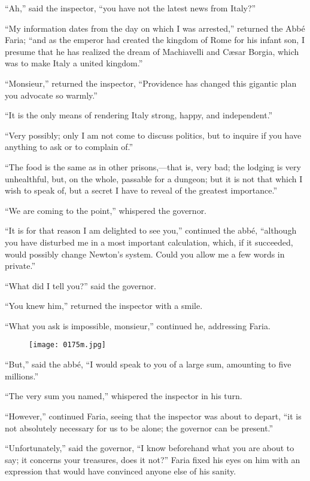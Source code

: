 “Ah,” said the inspector, “you have not the latest news from Italy?”

“My information dates from the day on which I was arrested,” returned
the Abbé Faria; “and as the emperor had created the kingdom of Rome for
his infant son, I presume that he has realized the dream of Machiavelli
and Cæsar Borgia, which was to make Italy a united kingdom.”

“Monsieur,” returned the inspector, “Providence has changed this
gigantic plan you advocate so warmly.”

“It is the only means of rendering Italy strong, happy, and
independent.”

“Very possibly; only I am not come to discuss politics, but to inquire
if you have anything to ask or to complain of.”

“The food is the same as in other prisons,—that is, very bad; the
lodging is very unhealthful, but, on the whole, passable for a dungeon;
but it is not that which I wish to speak of, but a secret I have to
reveal of the greatest importance.”

“We are coming to the point,” whispered the governor.

“It is for that reason I am delighted to see you,” continued the abbé,
“although you have disturbed me in a most important calculation, which,
if it succeeded, would possibly change Newton’s system. Could you allow
me a few words in private.”

“What did I tell you?” said the governor.

“You knew him,” returned the inspector with a smile.

“What you ask is impossible, monsieur,” continued he, addressing Faria.

\begin{figure}[ht]
\texttt{[image: 0175m.jpg]}
\end{figure}

“But,” said the abbé, “I would speak to you of a large sum, amounting
to five millions.”

“The very sum you named,” whispered the inspector in his turn.

“However,” continued Faria, seeing that the inspector was about to
depart, “it is not absolutely necessary for us to be alone; the
governor can be present.”

“Unfortunately,” said the governor, “I know beforehand what you are
about to say; it concerns your treasures, does it not?” Faria fixed his
eyes on him with an expression that would have convinced anyone else of
his sanity.

